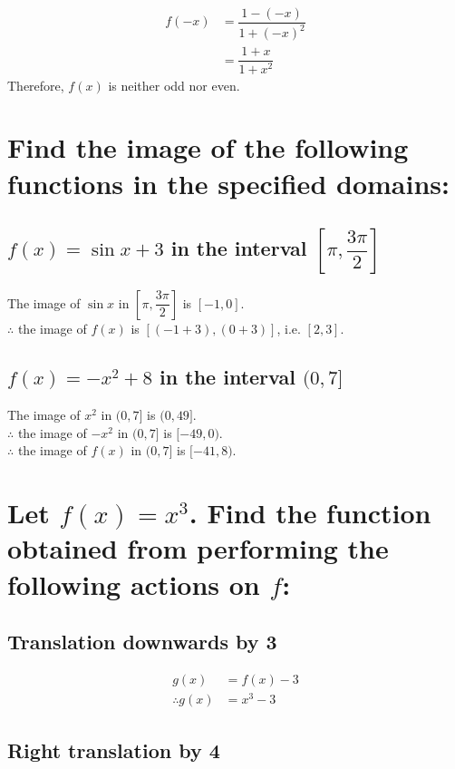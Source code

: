 \documentclass[fleqn, a4paper, 10pt]{article}
\begin{document}
\begin{align*}
	f(-x) &= \dfrac{1 - (-x)}{1 + (-x)^2}\\
	&= \dfrac{1 + x}{1 + x^2}
\end{align*}
Therefore, $f(x)$ is neither odd nor even.

\newpage
\section{Find the image of the following functions in the specified domains:}

\subsection{$f(x) = \sin x + 3$ in the interval $\left[\pi, \dfrac{3\pi}{2}\right]$}

The image of $\sin x$ in $\left[ \pi, \dfrac{3\pi}{2}\right] $ is $\left[-1, 0\right]$.\\
$\therefore$ the image of $f(x)$ is $\left[(-1+3), (0+3)\right]$, i.e. $\left[2,3\right].$

\subsection{$f(x) = -x^2 + 8$ in the interval $(0,7]$}

The image of $x^2$ in $(0, 7]$ is $(0, 49]$.\\
$\therefore$ the image of $-x^2$ in $(0, 7]$ is $[-49, 0)$.\\
$\therefore$ the image of $f(x)$ in $(0, 7]$ is $[-41, 8)$.

\section{Let $f(x) = x^3$. Find the function obtained from performing the following actions on $f$:
}

\subsection{Translation downwards by 3}

\begin{align*}
	g(x) &= f(x) - 3\\
	\therefore g(x) &= x^3 - 3
\end{align*}

\subsection{Right translation by 4}
\end{document}
